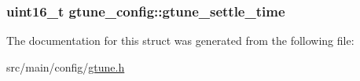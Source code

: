 \hypertarget{structgtune__config_a952d643f00b12b8ba7e1f23088bccf39}{
\subsubsection[{gtune\+\_\+settle\+\_\+time}]{\setlength{\rightskip}{0pt plus 5cm}uint16\+\_\+t gtune\+\_\+config\+::gtune\+\_\+settle\+\_\+time}}\label{structgtune__config_a952d643f00b12b8ba7e1f23088bccf39}


The documentation for this struct was generated from the following file\+:\begin{DoxyCompactItemize}
\item 
src/main/config/\hyperlink{config_2gtune_8h}{gtune.\+h}\end{DoxyCompactItemize}
